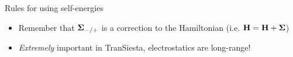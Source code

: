 \begin{frame}
\begin{block}{Rules for using self-energies}
\begin{center}
    \end{center}

    \vspace{-12pt}

    \begin{itemize}
      \item<+-> Remember that $\boldsymbol{\Sigma}_{-/+}$ is a correction to the Hamiltonian (i.e. 
      $\mathbf{H} = \mathbf{H} + \boldsymbol{\Sigma}$)

      \item \emph{Extremely} important in TranSiesta, electrostatics are long-range!
    \end{itemize}
  \end{block}


    

\end{frame}


